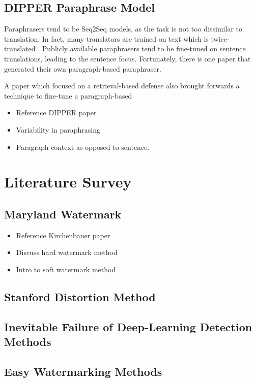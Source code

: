 \documentclass{l4proj}
\theoremstyle{definition}
\begin{document}
    \subsection{DIPPER Paraphrase Model}
        Paraphrasers tend to be Seq2Seq models, as the task is not too dissimilar to translation. In fact, many translators are trained on text which is twice-translated \citet{to french and back!}. Publicly available paraphrasers tend to be fine-tuned on sentence translations, leading to the sentence focus. Fortunately, there is one paper that generated their own paragraph-based paraphraser.

        A paper which focused on a retrieval-based defense also brought forwards a technique to fine-tune a paragraph-based 
        \begin{itemize}
            \setlength\itemsep{0.5em}
            \item Reference DIPPER paper
            \item Variability in paraphrasing 
            \item Paragraph context as opposed to sentence. 
        \end{itemize}

\section{Literature Survey}
    \subsection{Maryland Watermark}
        \begin{itemize}
            \setlength\itemsep{0.5em}
            \item Reference Kirchenbauer paper
            \item Discuss hard watermark method 
            \item Intro to soft watermark method
        \end{itemize}
    \subsection{Stanford Distortion Method}
    \subsection{Inevitable Failure of Deep-Learning Detection Methods}
    \subsection{Easy Watermarking Methods}
\end{document}
